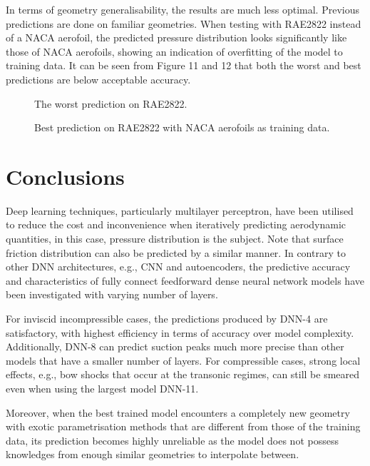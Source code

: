 \documentclass[11pt]{article}
\begin{document}
In terms of geometry generalisability, the results are much less optimal. Previous predictions are done on familiar geometries. When testing with RAE2822 instead of a NACA aerofoil, the predicted pressure distribution looks significantly like those of NACA aerofoils, showing an indication of overfitting of the model to training data. It can be seen from Figure 11 and 12 that both the worst and best predictions are below acceptable accuracy.

\begin{figure}[htbp]
    \centering
    
    \caption{The worst prediction on RAE2822.}
\end{figure}

\begin{figure}[htbp]
    \centering
    
    \caption{Best prediction on RAE2822 with NACA aerofoils as training data.}
\end{figure}

\section{Conclusions}

Deep learning techniques, particularly multilayer perceptron, have been utilised to reduce the cost and inconvenience when iteratively predicting aerodynamic quantities, in this case, pressure distribution is the subject. Note that surface friction distribution can also be predicted by a similar manner. In contrary to other DNN architectures, e.g., CNN and autoencoders, the predictive accuracy and characteristics of fully connect feedforward dense neural network models have been investigated with varying number of layers.

For inviscid incompressible cases, the predictions produced by DNN-4 are satisfactory, with highest efficiency in terms of accuracy over model complexity. Additionally, DNN-8 can predict suction peaks much more precise than other models that have a smaller number of layers. For compressible cases, strong local effects, e.g., bow shocks that occur at the transonic regimes, can still be smeared even when using the largest model DNN-11.

Moreover, when the best trained model encounters a completely new geometry with exotic parametrisation methods that are different from those of the training data, its prediction becomes highly unreliable as the model does not possess knowledges from enough similar geometries to interpolate between.
\end{document}
